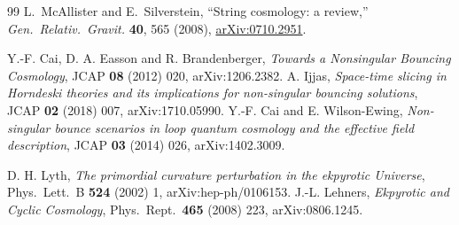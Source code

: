 \documentclass[a4paper,11pt]{article}
\begin{document}
\begin{thebibliography}{99}
L.~McAllister and E.~Silverstein,
``String cosmology: a review,''
\textit{Gen.\ Relativ.\ Gravit.} \textbf{40}, 565 (2008),
\href{https://arxiv.org/abs/0710.2951}{arXiv:0710.2951}.


 Y.-F. Cai, D. A. Easson and R. Brandenberger, \emph{Towards a Nonsingular Bouncing Cosmology}, JCAP \textbf{08} (2012) 020, arXiv:1206.2382.
 A. Ijjas, \emph{Space-time slicing in Horndeski theories and its implications for non-singular bouncing solutions}, JCAP \textbf{02} (2018) 007, arXiv:1710.05990.
 Y.-F. Cai and E. Wilson-Ewing, \emph{Non-singular bounce scenarios in loop quantum cosmology and the effective field description}, JCAP \textbf{03} (2014) 026, arXiv:1402.3009.

 D. H. Lyth, \emph{The primordial curvature perturbation in the ekpyrotic Universe}, Phys.\ Lett.\ B \textbf{524} (2002) 1, arXiv:hep-ph/0106153.
 J.-L. Lehners, \emph{Ekpyrotic and Cyclic Cosmology}, Phys.\ Rept.\ \textbf{465} (2008) 223, arXiv:0806.1245.
\end{thebibliography}
\end{document}
